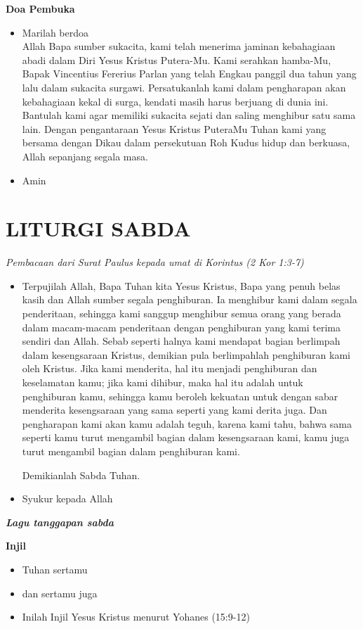 \documentclass[titlepage,10pt,openany]{scrbook}
\makeatletter
\newcommand{\subjudul}[1]{%
  {\parindent \z@ 
    \interlinepenalty\@M \bfseries #1\par\nobreak \vskip 10\p@ }}
\newcommand{\lagu}[1]{%
  {\parindent \z@ 
    \interlinepenalty\@M \slshape \bfseries \normalsize \textit{#1}\par\nobreak \vskip 10\p@ }}
\newcommand{\keterangan}[1]{%
  {\parindent \z@  \slshape 
    \interlinepenalty\@M \textsl{#1}\par\nobreak  \vskip 5\p@}}
\newcommand{\BU}[1]{\begin{itemize} \item[U:] #1 \end{itemize}}
\newcommand{\BI}[1]{\begin{itemize} \item[I:] #1 \end{itemize}}
\newcommand{\BP}[1]{\begin{itemize} \item[P:] #1 \end{itemize}}
\newcommand{\namaalm}{Bapak Vincentius Fererius Parlan }
\makeatother
\begin{document}
\subjudul{Doa Pembuka}

\BI{Marilah berdoa\\
	Allah Bapa sumber sukacita, kami telah menerima jaminan kebahagiaan abadi dalam Diri Yesus Kristus Putera-Mu. Kami serahkan hamba-Mu, \namaalm{} yang telah Engkau panggil dua tahun yang lalu dalam sukacita surgawi. Persatukanlah kami dalam pengharapan akan kebahagiaan kekal di surga, kendati masih harus berjuang di dunia ini. Bantulah kami agar memiliki sukacita sejati dan saling menghibur satu sama lain. Dengan pengantaraan Yesus Kristus PuteraMu Tuhan kami yang bersama dengan Dikau dalam persekutuan Roh Kudus hidup dan berkuasa, Allah sepanjang segala masa.}

\BU{Amin}

 

\section*{LITURGI SABDA} 

\keterangan{Pembacaan dari Surat Paulus kepada umat di
Korintus (2 Kor 1:3-7)}

\BP{Terpujilah Allah, Bapa Tuhan kita Yesus Kristus, Bapa yang penuh belas
	kasih dan Allah sumber segala penghiburan. Ia menghibur kami dalam
	segala penderitaan, sehingga kami sanggup menghibur semua orang
	yang berada dalam macam-macam penderitaan dengan penghiburan
	yang kami terima sendiri dan Allah. Sebab seperti halnya kami
	mendapat bagian berlimpah dalam kesengsaraan Kristus, demikian pula
	berlimpahlah penghiburan kami oleh Kristus. Jika kami menderita, hal
	itu menjadi penghiburan dan keselamatan kamu; jika kami dihibur,
	maka hal itu adalah untuk penghiburan kamu, sehingga kamu beroleh
	kekuatan untuk dengan sabar menderita kesengsaraan yang sama
	seperti yang kami derita juga. Dan pengharapan kami akan kamu adalah
	teguh, karena kami tahu, bahwa sama seperti kamu turut mengambil
	bagian dalam kesengsaraan kami, kamu juga turut mengambil bagian
	dalam penghiburan kami. 
	
	
Demikianlah Sabda Tuhan.}

\BU{Syukur kepada Allah}

\lagu{Lagu tanggapan sabda}
 

\subjudul{Injil}

\BI{Tuhan sertamu}

\BU{dan sertamu juga} 

\BI{Inilah Injil Yesus Kristus menurut Yohanes (15:9-12)}
\end{document}
